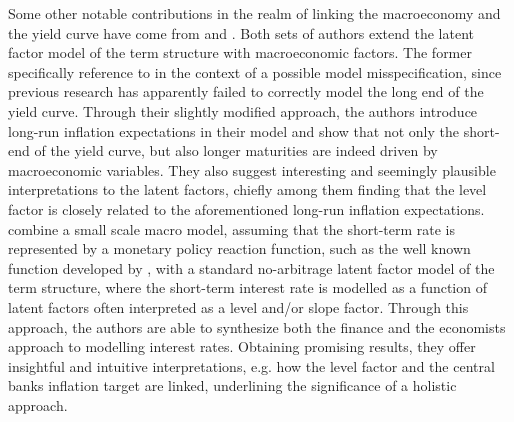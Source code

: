 Some other notable contributions in the realm of linking the macroeconomy and the yield curve have come from \citet{dewachter2006macro} and \citet{rudebusch2008macro}. 
Both sets of authors extend the latent factor model of the term structure with macroeconomic factors. 
The former specifically reference to \citet{ang2003no} in the context of a possible model misspecification, since previous research has apparently failed to correctly model the long end of the yield curve. 
Through their slightly modified approach, the authors introduce long-run inflation expectations in their model and show that not only the short-end of the yield curve, but also longer maturities are indeed driven by macroeconomic variables. 
They also suggest interesting and seemingly plausible interpretations to the latent factors, chiefly among them finding that the level factor is closely related to the aforementioned long-run inflation expectations.
\citet{rudebusch2008macro} combine a small scale macro model, assuming that the short-term rate is represented by a monetary policy reaction function, such as the well known function developed by \citet{taylor1993discretion}, with a standard no-arbitrage latent factor model of the term structure, where the short-term interest rate is modelled as a function of latent factors often interpreted as a level and/or slope factor.
Through this approach, the authors are able to synthesize both the finance and the economists approach to modelling interest rates. Obtaining promising results, they offer insightful and intuitive interpretations, e.g. how the level factor and the central banks inflation target are linked, underlining the significance of a holistic approach.



